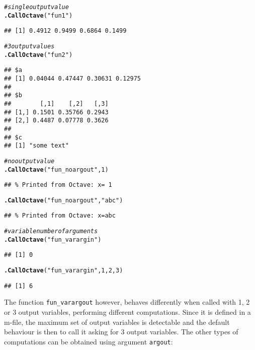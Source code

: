 \documentclass[english,10pt,a4paper]{article}\usepackage[]{graphicx}\usepackage[]{color}
\makeatletter
\newcommand{\hlnum}[1]{\textcolor[rgb]{0.686,0.059,0.569}{#1}}%
\newcommand{\hlstr}[1]{\textcolor[rgb]{0.192,0.494,0.8}{#1}}%
\newcommand{\hlcom}[1]{\textcolor[rgb]{0.678,0.584,0.686}{\textit{#1}}}%
\newcommand{\hlstd}[1]{\textcolor[rgb]{0.345,0.345,0.345}{#1}}%
\newcommand{\hlkwd}[1]{\textcolor[rgb]{0.737,0.353,0.396}{\textbf{#1}}}%
\newenvironment{kframe}{%
 \def\at@end@of@kframe{}%
 \ifinner\ifhmode%
  \def\at@end@of@kframe{\end{minipage}}%
  \begin{minipage}{\columnwidth}%
 \fi\fi%
 \def\FrameCommand##1{\hskip\@totalleftmargin \hskip-\fboxsep
 \colorbox{shadecolor}{##1}\hskip-\fboxsep
     \hskip-\linewidth \hskip-\@totalleftmargin \hskip\columnwidth}%
 \MakeFramed {\advance\hsize-\width
   \@totalleftmargin\z@ \linewidth\hsize
   \@setminipage}}%
 {\par\unskip\endMakeFramed%
 \at@end@of@kframe}
\newenvironment{knitrout}{}{} %
\let\code=\texttt
\makeatother
\begin{document}
\begin{knitrout}
\color{fgcolor}\begin{kframe}
\begin{alltt}
\hlcom{# single output value}
\hlkwd{.CallOctave}\hlstd{(}\hlstr{"fun1"}\hlstd{)}
\end{alltt}
\begin{verbatim}
## [1] 0.4912 0.9499 0.6864 0.1499
\end{verbatim}
\begin{alltt}
\hlcom{# 3 output values}
\hlkwd{.CallOctave}\hlstd{(}\hlstr{"fun2"}\hlstd{)}
\end{alltt}
\begin{verbatim}
## $a
## [1] 0.04044 0.47447 0.30631 0.12975
## 
## $b
##        [,1]    [,2]   [,3]
## [1,] 0.1501 0.35766 0.2943
## [2,] 0.4487 0.07778 0.3626
## 
## $c
## [1] "some text"
\end{verbatim}
\begin{alltt}
\hlcom{# no output value}
\hlkwd{.CallOctave}\hlstd{(}\hlstr{"fun_noargout"}\hlstd{,} \hlnum{1}\hlstd{)}
\end{alltt}
\begin{verbatim}
## % Printed from Octave: x= 1
\end{verbatim}
\begin{alltt}
\hlkwd{.CallOctave}\hlstd{(}\hlstr{"fun_noargout"}\hlstd{,} \hlstr{"abc"}\hlstd{)}
\end{alltt}
\begin{verbatim}
## % Printed from Octave: x=abc
\end{verbatim}
\begin{alltt}
\hlcom{# variable number of arguments}
\hlkwd{.CallOctave}\hlstd{(}\hlstr{"fun_varargin"}\hlstd{)}
\end{alltt}
\begin{verbatim}
## [1] 0
\end{verbatim}
\begin{alltt}
\hlkwd{.CallOctave}\hlstd{(}\hlstr{"fun_varargin"}\hlstd{,} \hlnum{1}\hlstd{,} \hlnum{2}\hlstd{,} \hlnum{3}\hlstd{)}
\end{alltt}
\begin{verbatim}
## [1] 6
\end{verbatim}
\end{kframe}
\end{knitrout}


The function \code{fun\_varargout} however, behaves differently when called
with 1, 2 or 3 output variables, performing different computations.
Since it is defined in a m-file, the maximum set of output variables is
detectable and the default behaviour is then to call it asking for 3 output
variables.
The other types of computations can be obtained using argument \code{argout}:
\end{document}

